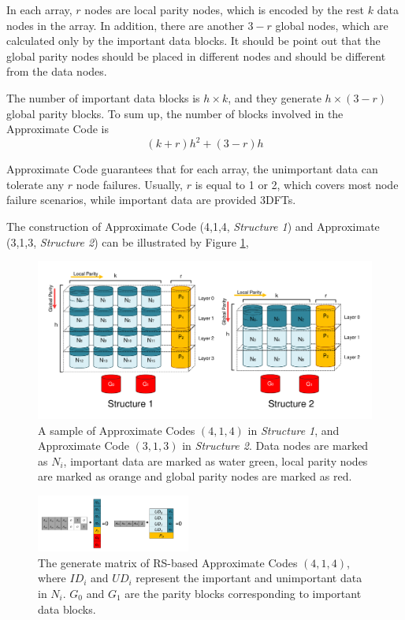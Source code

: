 \documentclass[sigconf]{acmart}
\begin{document}
In each array, $r$ nodes are local parity nodes, which is encoded by the rest $k$ data nodes in the array.
In addition, there are another $3-r$ global nodes, which are calculated only by the important data blocks. It should be point out that the global parity nodes should be placed in different nodes and should be different from the data nodes. 

The number of important data blocks is $h \times k$, and they generate $h \times (3-r)$ global parity blocks.
To sum up, the number of blocks involved in the Approximate Code is 
$$(k+r)h^2 + (3-r) h$$


Approximate Code guarantees that for each array, the unimportant data can tolerate any $r$ node failures. Usually, $r$ is equal to 1 or 2, which covers most node failure scenarios, while important data are provided 3DFTs.

The construction of Approximate Code (4,1,4, \emph{Structure 1}) and Approximate (3,1,3, \emph{Structure 2}) can be illustrated by Figure \ref{fig-ap-414},


\begin{figure}[]
\centering
\includegraphics[width=\linewidth]{photo/AP-kmha-v7.pdf}
\caption{A sample of Approximate Codes $(4,1,4)$ in \emph{Structure 1}, and Approximate Code $(3,1,3)$ in \emph{Structure 2}.
Data nodes are marked as $N_i$, important data are marked as water green, local parity nodes are marked as orange and global parity nodes are marked as red.
}
\label{fig-ap-414}
\end{figure}

\begin{figure}[htb]
\centering
\includegraphics[width=0.45\textwidth]{photo/AP-RS-43.pdf}
\caption{The generate matrix of RS-based Approximate Codes $(4,1,4)$, where $ID_i$ and $UD_i$ represent the important and unimportant data in $N_i$. $G_0$ and $G_1$ are the parity blocks corresponding to important data blocks.}
\label{fig-ap-rs}
\end{figure}
\end{document}
